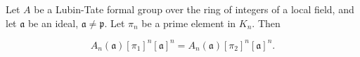 Let $A$ be a Lubin-Tate formal group over the ring of integers of a local field, and let $\mathfrak{a}$ be an ideal, $\mathfrak{a} \neq \mathfrak{p}$. Let $\pi_n$ be a prime element in $K_n$. Then

$$A_n(\mathfrak{a})[\pi_1]^n[\mathfrak{a}]^n = A_n(\mathfrak{a})[\pi_2]^n[\mathfrak{a}]^n.$$
